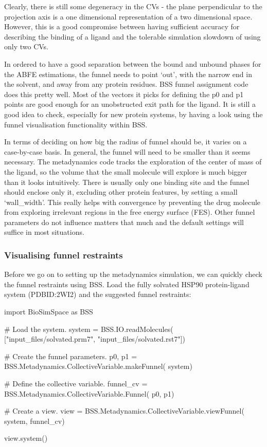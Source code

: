 Clearly, there is still some degeneracy in the CVs - the plane
perpendicular to the projection axis is a one dimensional representation of a two dimensional space. However, this is a good compromise between having sufficient accuracy for describing the binding of a
ligand and the tolerable simulation slowdown of using only two CVs.

In ordered to have a good separation between the bound and unbound phases for the ABFE estimations, the funnel needs to point `out', with the narrow end in the solvent,
and away from any protein residues. BSS funnel assignment code does this pretty well. Most of the vectors it picks for defining the p0 and p1 points are good enough for an unobstructed exit path for the ligand. It is still a good idea to check, especially for new protein systems, by
having a look using the funnel visualisation functionality within BSS.

In terms of deciding on how big the radius of funnel should be, it varies on a case-by-case basis.
In general, the funnel will need to be smaller than it seems necessary. The metadynamics code tracks the exploration of the center of mass of the ligand, so the volume that the small molecule will explore is much bigger than it looks intuitively. There is usually only one binding site and the funnel should enclose only it, excluding other protein
features, by setting a small `wall\_width'. This really helps with
convergence by preventing the drug molecule from exploring irrelevant
regions in the free energy surface (FES). Other funnel parameters do not influence matters
that much and the default settings will suffice in most situations.

\hypertarget{visualising-restraints}{%
\subsubsection{Visualising funnel restraints}\label{Visualising the funnel restraints}}

Before we go on to setting up the metadynamics simulation, we can quickly check the funnel restraints using BSS. Load the fully solvated HSP90 protein-ligand system (PDBID:2WI2) and the suggested funnel restraints:

\begin{python}
import BioSimSpace as BSS

# Load the system.
system = BSS.IO.readMolecules(
            ["input_files/solvated.prm7",
             "input_files/solvated.rst7"])

# Create the funnel parameters.
p0, p1 = BSS.Metadynamics.CollectiveVariable.makeFunnel(
            system)

# Define the collective variable.
funnel_cv = BSS.Metadynamics.CollectiveVariable.Funnel(
            p0, p1)

# Create a view.
view = BSS.Metadynamics.CollectiveVariable.viewFunnel(
            system, funnel_cv)

view.system()

\end{python}

